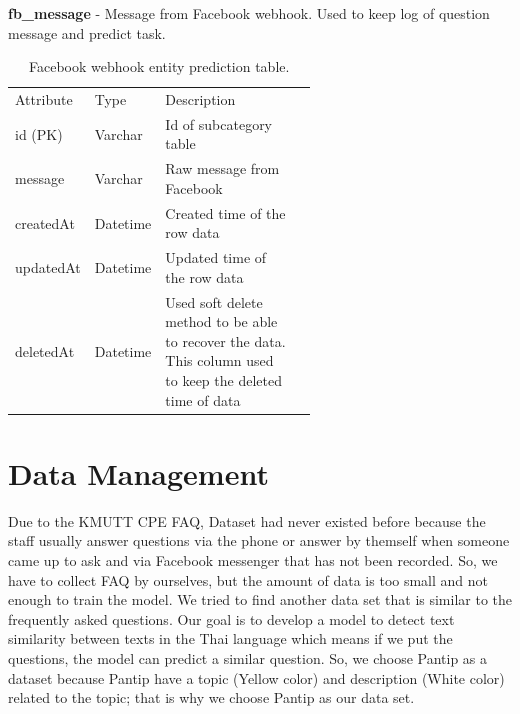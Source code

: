 \documentclass[12pt,oneside,openright,a4paper]{cpe-english-project}
\begin{document}
\textbf{fb\_message} - Message from Facebook webhook. Used to keep log of question message and predict task.
\begin{table}[ht]
	\caption{Facebook webhook entity prediction table.}
	\label{tab:Facebook webhook entity prediction table.}
\begin{adjustbox}{width=\textwidth}
\begin{tabular}{llp{0.6\linewidth}l}
\rowcolor[HTML]{5B9BD5} 
Attribute & Type     & Description                                                                                                 \\
\rowcolor[HTML]{DEEAF6} 
id (PK)   & Varchar  & Id of subcategory table                                                                                     \\
message   & Varchar  & Raw message from Facebook                                                                                   \\
\rowcolor[HTML]{DEEAF6} 
createdAt & Datetime & Created time of the row data                                                                                \\
updatedAt & Datetime & Updated time of the row   data                                                                              \\
\rowcolor[HTML]{DEEAF6} 
deletedAt & Datetime & Used soft delete method to be able to recover the data. This column   used to keep the deleted time of data
\end{tabular}
\end{adjustbox}
\end{table}

\pagebreak

\section{Data Management}
\begin{flushleft}
Due to the KMUTT CPE FAQ, Dataset had never existed before because the staff usually answer questions via the phone or answer by themself when someone came up to ask and via Facebook messenger that has not been recorded. So, we have to collect FAQ by ourselves, but the amount of data is too small and not enough to train the model. We tried to find another data set that is similar to the frequently asked questions. Our goal is to develop a model to detect text similarity between texts in the Thai language which means if we put the questions, the model can predict a similar question. So, we choose Pantip as a dataset because Pantip have a topic (Yellow color) and description (White color) related to the topic; that is why we choose Pantip as our data set.
\end{flushleft}
\end{document}

